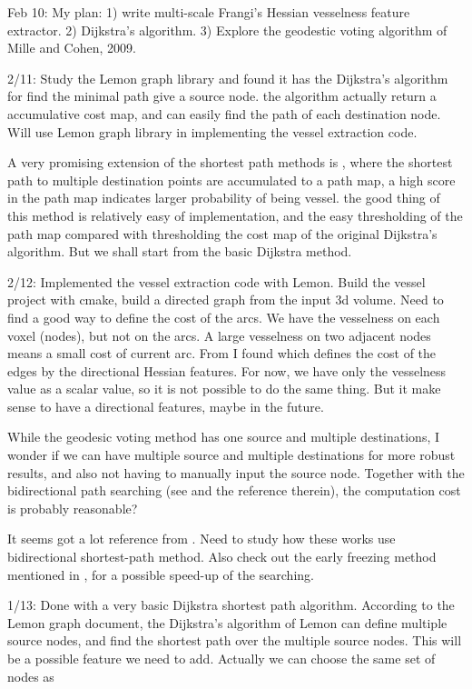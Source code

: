 \documentclass[12pt]{article}
\begin{document}
Feb 10: My plan: 1) write multi-scale Frangi's Hessian vesselness feature
extractor. 2) Dijkstra's algorithm. 3) Explore the geodestic voting algorithm
of Mille and Cohen, 2009.

2/11: Study the Lemon graph library and found it has the Dijkstra's algorithm
for find the minimal path give a source node. the algorithm actually return a
accumulative cost map, and can easily find the path of each destination
node. Will use Lemon graph library in implementing the vessel extraction code.

A very promising extension of the shortest path methods is
\cite{rouchdy2011geodesic}, where the shortest path to multiple destination
points are accumulated to a path map, a high score in the path map indicates
larger probability of being vessel. the good thing of this method is relatively
easy of implementation, and the easy thresholding of the path map compared with
thresholding the cost map of the original Dijkstra's algorithm. But we shall
start from the basic Dijkstra method.

2/12: Implemented the vessel extraction code with Lemon. Build the vessel
project with cmake, build a directed graph from the input 3d volume. Need to
find a good way to define the cost of the arcs. We have the vesselness on each
voxel (nodes), but not on the arcs. A large vesselness on two adjacent nodes
means a small cost of current arc. From \cite{lesage2009review} I found
\cite{gulsun2008robust} which defines the cost of the edges by the directional
Hessian features. For now, we have only the vesselness value as a scalar value,
so it is not possible to do the same thing. But it make sense to have a
directional features, maybe in the future.

While the geodesic voting method has one source and multiple destinations, I
wonder if we can have multiple source and multiple destinations for more
robust results, and also not having to manually input the source
node. Together with the bidirectional path searching (see
\cite{lesage2009review} and the reference therein), the computation cost is
probably reasonable?

It seems \cite{olabarriaga2003minimum} got a lot reference from
\cite{wink2000minimum}. Need to study how these works use bidirectional
shortest-path method. Also check out the early freezing method mentioned in
\cite{lesage2009review}, for a possible speed-up of the searching.

1/13: Done with a very basic Dijkstra shortest path algorithm. According to
the Lemon graph document, the Dijkstra's algorithm of Lemon can define
multiple source nodes, and find the shortest path over the multiple source
nodes. This will be a possible feature we need to add. Actually we can choose
the same set of nodes as
\end{document}
